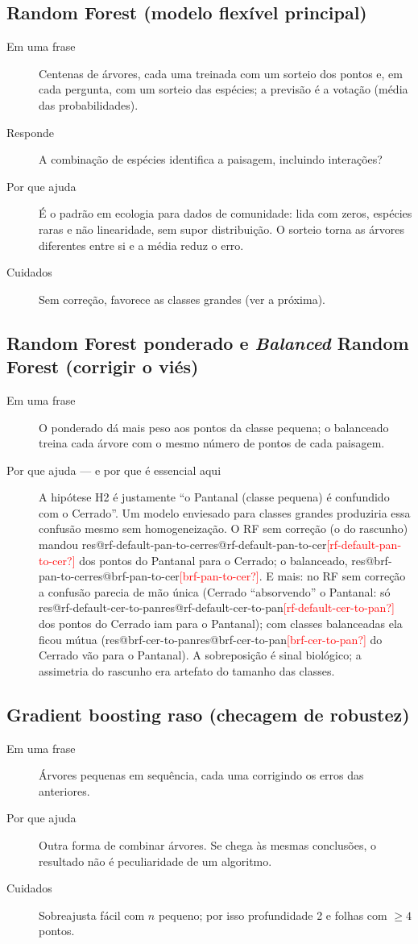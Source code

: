 \documentclass[11pt,a4paper]{article}
\makeatletter
\newcommand{\res}[1]{\ifcsname res@#1\endcsname\csname res@#1\endcsname\else\textcolor{red}{[#1?]}\fi}
\makeatother
\begin{document}
\subsection{Random Forest (modelo flexível principal)}
\begin{description}
\item[Em uma frase] Centenas de árvores, cada uma treinada com um sorteio dos pontos e, em cada
pergunta, com um sorteio das espécies; a previsão é a votação (média das probabilidades).
\item[Responde] A combinação de espécies identifica a paisagem, incluindo interações?
\item[Por que ajuda] É o padrão em ecologia para dados de comunidade: lida com zeros, espécies
raras e não linearidade, sem supor distribuição. O sorteio torna as árvores diferentes entre si e
a média reduz o erro.
\item[Cuidados] Sem correção, favorece as classes grandes (ver a próxima).
\end{description}

\subsection{Random Forest ponderado e \emph{Balanced} Random Forest (corrigir o viés)}
\begin{description}
\item[Em uma frase] O ponderado dá mais peso aos pontos da classe pequena; o balanceado treina
cada árvore com o mesmo número de pontos de cada paisagem.
\item[Por que ajuda --- e por que é essencial aqui] A hipótese H2 é justamente ``o Pantanal (classe
pequena) é confundido com o Cerrado''. Um modelo enviesado para classes grandes produziria essa
confusão mesmo sem homogeneização. O RF sem correção (o do rascunho) mandou
\res{rf-default-pan-to-cer} dos pontos do Pantanal para o Cerrado; o balanceado,
\res{brf-pan-to-cer}. E mais: no RF sem correção a confusão parecia de mão única (Cerrado
``absorvendo'' o Pantanal: só \res{rf-default-cer-to-pan} dos pontos do Cerrado iam para o Pantanal);
com classes balanceadas ela ficou mútua (\res{brf-cer-to-pan} do Cerrado vão para o Pantanal). A
sobreposição é sinal biológico; a assimetria do rascunho era artefato do tamanho das classes.
\end{description}

\subsection{Gradient boosting raso (checagem de robustez)}
\begin{description}
\item[Em uma frase] Árvores pequenas em sequência, cada uma corrigindo os erros das anteriores.
\item[Por que ajuda] Outra forma de combinar árvores. Se chega às mesmas conclusões, o resultado
não é peculiaridade de um algoritmo.
\item[Cuidados] Sobreajusta fácil com $n$ pequeno; por isso profundidade 2 e folhas com $\geq4$ pontos.
\end{description}
\end{document}
